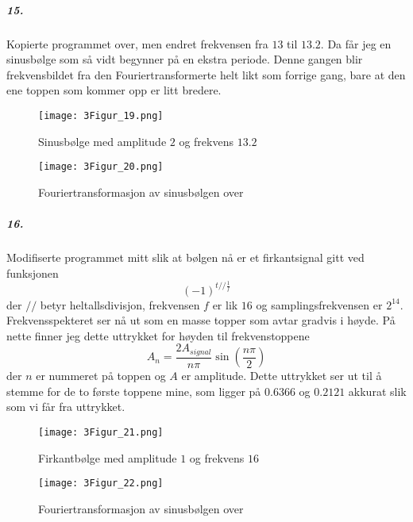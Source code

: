 \documentclass[11pt, A4paper,norsk]{article}
\begin{document}
			\subparagraph{15.}
				\begin{flushleft}
Kopierte programmet over, men endret frekvensen fra $13$ til $13.2$.
Da får jeg en sinusbølge som så vidt begynner på en ekstra periode. Denne gangen blir frekvensbildet fra den Fouriertransformerte helt likt som forrige gang, bare at den ene toppen som kommer opp er litt bredere. 
				\end{flushleft}
				\begin{figure}[H]
\texttt{[image: 3Figur\_19.png]} \\
\caption{Sinusbølge med amplitude $2$ og frekvens $13.2$}
				\end{figure}
				\begin{figure}[H]
\texttt{[image: 3Figur\_20.png]} \\
\caption{Fouriertransformasjon av sinusbølgen over}
				\end{figure}










			\subparagraph{16.}
				\begin{flushleft}
Modifiserte programmet mitt slik at bølgen nå er et firkantsignal gitt ved funksjonen $$(-1)^{t // \frac{1}{f}}$$ der $//$ betyr heltallsdivisjon, frekvensen $f$ er lik $16$ og samplingsfrekvensen er $2^{14}$. Frekvensspekteret ser nå ut som en masse topper som avtar gradvis i høyde.
På nette finner jeg dette uttrykket for høyden til frekvenstoppene
$$A_n = \frac{2 A_{signal}}{n \pi} \sin\left( \frac{n \pi}{2} \right)$$ der $n$ er nummeret på toppen og $A$ er amplitude. Dette uttrykket ser ut til å stemme for de to første toppene mine, som ligger på $0.6366$ og $0.2121$ akkurat slik som vi får fra uttrykket.
				\end{flushleft}
				\begin{figure}[H]
\texttt{[image: 3Figur\_21.png]} \\
\caption{Firkantbølge med amplitude $1$ og frekvens $16$}
				\end{figure}
				\begin{figure}[H]
\texttt{[image: 3Figur\_22.png]} \\
\caption{Fouriertransformasjon av sinusbølgen over}
				\end{figure}

\end{document}
